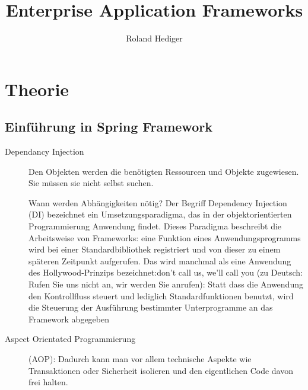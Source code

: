 \documentclass[a4paper,10pt]{scrreprt}
\title{Enterprise Application Frameworks}
\author{Roland Hediger}
\begin{document}
\maketitle
\tableofcontents
\newpage
 \pagestyle{fancy}
\part{Theorie}
\chapter{Einführung in Spring Framework}
\begin{description}
 \item [Dependancy Injection] Den Objekten werden die benötigten Ressourcen und Objekte
zugewiesen. Sie müssen sie nicht selbst suchen.
 
 Wann werden Abhängigkeiten nötig? Der Begriff Dependency Injection (DI) bezeichnet ein Umsetzungsparadigma, das in der objektorientierten Programmierung Anwendung findet.
Dieses Paradigma beschreibt die Arbeitsweise von Frameworks: eine Funktion eines
Anwendungsprogramms wird bei einer Standardbibliothek registriert und von dieser zu einem
späteren Zeitpunkt aufgerufen. Das wird manchmal als eine Anwendung des Hollywood-Prinzips
bezeichnet:don't call us, we'll call you (zu Deutsch: Rufen Sie uns nicht an, wir werden Sie
anrufen): Statt dass die Anwendung den Kontrollfluss steuert und lediglich Standardfunktionen
benutzt, wird die Steuerung der Ausführung bestimmter Unterprogramme an das Framework
abgegeben
\item [Aspect Orientated Programmierung] (AOP): Dadurch kann man vor allem technische Aspekte
wie Transaktionen oder Sicherheit isolieren und den eigentlichen Code davon frei halten.
 


\end{description}
\end{document}
